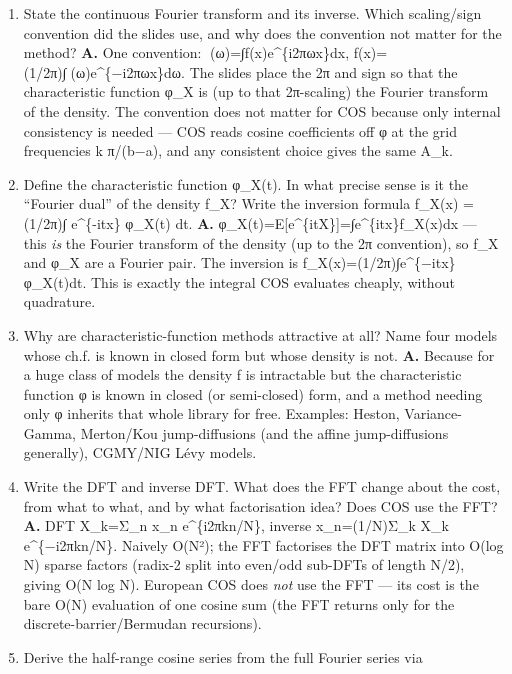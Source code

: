\documentclass[
  11pt,
]{article}
\providecommand{\tightlist}{%
  \setlength{\itemsep}{0pt}\setlength{\parskip}{0pt}}
\begin{document}
\begin{enumerate}
\def\labelenumi{\arabic{enumi}.}
\tightlist
\item
  State the continuous Fourier transform and its inverse. Which
  scaling/sign convention did the slides use, and why does the
  convention not matter for the method? \textbf{A.} One convention:
  (ω)=∫f(x)e\^{}\{i2πωx\}dx, f(x)=(1/2π)∫(ω)e\^{}\{−i2πωx\}dω. The
  slides place the 2π and sign so that the characteristic function φ\_X
  is (up to that 2π-scaling) the Fourier transform of the density. The
  convention does not matter for COS because only internal consistency
  is needed --- COS reads cosine coefficients off φ at the grid
  frequencies k π/(b−a), and any consistent choice gives the same A\_k.
\item
  Define the characteristic function φ\_X(t). In what precise sense is
  it the ``Fourier dual'' of the density f\_X? Write the inversion
  formula f\_X(x) = (1/2π)∫ e\^{}\{-itx\} φ\_X(t) dt. \textbf{A.}
  φ\_X(t)=E{[}e\^{}\{itX\}{]}=∫e\^{}\{itx\}f\_X(x)dx --- this \emph{is}
  the Fourier transform of the density (up to the 2π convention), so
  f\_X and φ\_X are a Fourier pair. The inversion is
  f\_X(x)=(1/2π)∫e\^{}\{−itx\}φ\_X(t)dt. This is exactly the integral
  COS evaluates cheaply, without quadrature.
\item
  Why are characteristic-function methods attractive at all? Name four
  models whose ch.f. is known in closed form but whose density is not.
  \textbf{A.} Because for a huge class of models the density f is
  intractable but the characteristic function φ is known in closed (or
  semi-closed) form, and a method needing only φ inherits that whole
  library for free. Examples: Heston, Variance-Gamma, Merton/Kou
  jump-diffusions (and the affine jump-diffusions generally), CGMY/NIG
  Lévy models.
\item
  Write the DFT and inverse DFT. What does the FFT change about the
  cost, from what to what, and by what factorisation idea? Does COS use
  the FFT? \textbf{A.} DFT X\_k=Σ\_n x\_n e\^{}\{i2πkn/N\}, inverse
  x\_n=(1/N)Σ\_k X\_k e\^{}\{−i2πkn/N\}. Naively O(N²); the FFT
  factorises the DFT matrix into O(log N) sparse factors (radix-2 split
  into even/odd sub-DFTs of length N/2), giving O(N log N). European COS
  does \emph{not} use the FFT --- its cost is the bare O(N) evaluation
  of one cosine sum (the FFT returns only for the
  discrete-barrier/Bermudan recursions).
\item
  Derive the half-range cosine series from the full Fourier series via

\end{enumerate}
\end{document}

